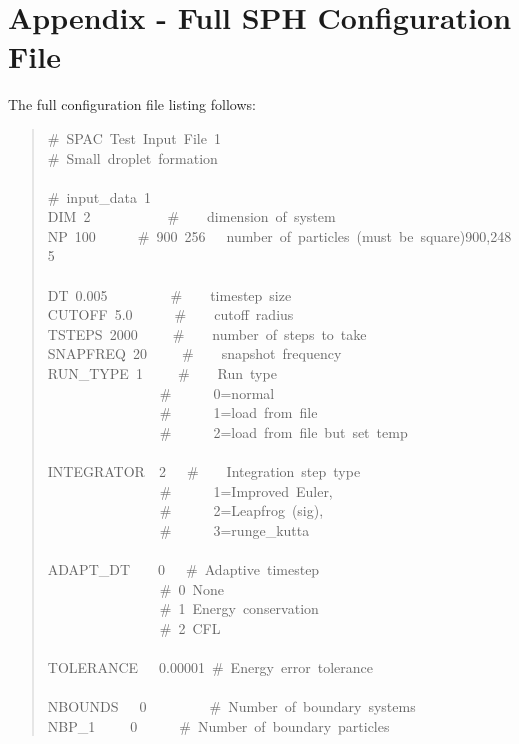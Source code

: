 \section*{Appendix - Full SPH Configuration File}

The full configuration file listing follows:
\begin{quote}{\ttfamily \raggedright \noindent
{\#}~SPAC~Test~Input~File~1~\\
{\#}~Small~droplet~formation~\\
~\\
{\#}~input{\_}data~1~\\
DIM~2~~~~~~~~~~~{\#}~~~~dimension~of~system~\\
NP~100~~~~~~{\#}~900~256~~~number~of~particles~(must~be~square)900,2485~\\
~\\
DT~0.005~~~~~~~~~{\#}~~~~timestep~size~\\
CUTOFF~5.0~~~~~~{\#}~~~~cutoff~radius~\\
TSTEPS~2000~~~~~{\#}~~~~number~of~steps~to~take~\\
SNAPFREQ~20~~~~~{\#}~~~~snapshot~frequency~\\
RUN{\_}TYPE~1~~~~~{\#}~~~~Run~type~\\
~~~~~~~~~~~~~~~~{\#}~~~~~~0=normal~\\
~~~~~~~~~~~~~~~~{\#}~~~~~~1=load~from~file~\\
~~~~~~~~~~~~~~~~{\#}~~~~~~2=load~from~file~but~set~temp~\\
~\\
INTEGRATOR~~2~~~{\#}~~~~Integration~step~type~\\
~~~~~~~~~~~~~~~~{\#}~~~~~~1=Improved~Euler,~\\
~~~~~~~~~~~~~~~~{\#}~~~~~~2=Leapfrog~(sig),~\\
~~~~~~~~~~~~~~~~{\#}~~~~~~3=runge{\_}kutta~\\
~\\
ADAPT{\_}DT~~~~0~~~{\#}~Adaptive~timestep~\\
~~~~~~~~~~~~~~~~{\#}~0~None~\\
~~~~~~~~~~~~~~~~{\#}~1~Energy~conservation~\\
~~~~~~~~~~~~~~~~{\#}~2~CFL~\\
~\\
TOLERANCE~~~0.00001~{\#}~Energy~error~tolerance~\\
~\\
NBOUNDS~~~0~~~~~~~~~{\#}~Number~of~boundary~systems~\\
NBP{\_}1~~~~~0~~~~~~{\#}~Number~of~boundary~particles~\\
}
\end{quote}
